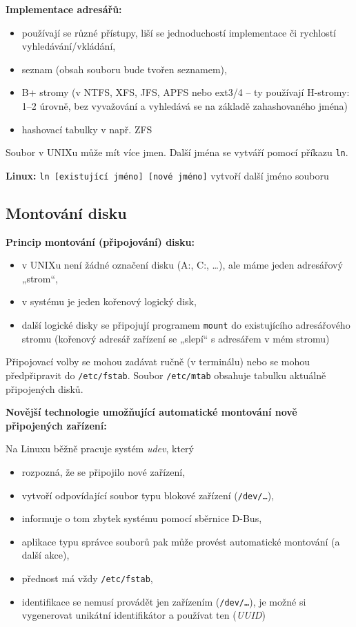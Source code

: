 \documentclass[a4paper, 11pt]{article}
\newcommand{\tcmd}[1]{\texttt{#1}}
\begin{document}
\textbf{Implementace adresářů:}
\begin{itemize}
\item používají se různé přístupy, liší se jednoduchostí implementace či rychlostí vyhledávání/vkládání,
\item seznam (obsah souboru bude tvořen seznamem),
\item B+ stromy (v NTFS, XFS, JFS, APFS nebo ext3/4 -- ty používají H-stromy: 1--2 úrovně, bez vyvažování a vyhledává se na základě zahashovaného jména)
\item hashovací tabulky v např. ZFS
\end{itemize}

Soubor v UNIXu může mít více jmen. Další jména se vytváří pomocí příkazu \verb|ln|.

\textbf{Linux:}
\tcmd{ln [existující jméno] [nové jméno]} vytvoří další jméno souboru

\subsection{Montování disku}
\textbf{Princip montování (připojování) disku:}
\begin{itemize}
\item v UNIXu není žádné označení disku (A:, C:, \ldots), ale máme jeden adresářový „strom“,
\item v systému je jeden kořenový logický disk,
\item další logické disky se připojují programem \tcmd{mount} do existujícího adresářového stromu (kořenový adresář zařízení se „slepí“ s adresářem v mém stromu)
\end{itemize}

Připojovací volby se mohou zadávat ručně (v terminálu) nebo se mohou předpřipravit do \tcmd{/etc/fstab}. Soubor \tcmd{/etc/mtab} obsahuje tabulku aktuálně připojených disků.

\textbf{Novější technologie umožňující automatické montování nově připojených zařízení:}

Na Linuxu běžně pracuje systém \emph{udev}, který
\begin{itemize}
\item rozpozná, že se připojilo nové zařízení,
\item vytvoří odpovídající soubor typu blokové zařízení (\tcmd{/dev/\ldots}),
\item informuje o tom zbytek systému pomocí sběrnice D-Bus,
\item aplikace typu správce souborů pak může provést automatické montování (a další akce),
\item přednost má vždy \tcmd{/etc/fstab},
\item identifikace se nemusí provádět jen zařízením (\tcmd{/dev/\ldots}), je možné si vygenerovat unikátní identifikátor a používat ten (\emph{UUID})
\end{itemize}
\end{document}
